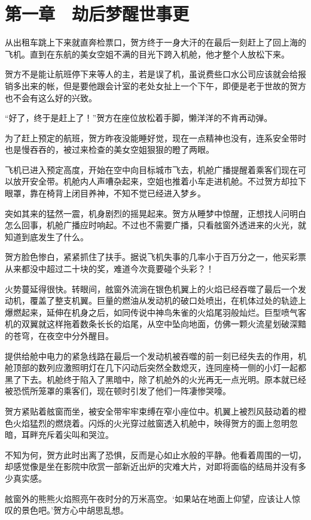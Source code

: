 \section{第一章　劫后梦醒世事更}

从出租车跳上下来就直奔检票口，贺方终于一身大汗的在最后一刻赶上了回上海的飞机。直到在东航的美女空姐不满的目光下跨入机舱，他才整个人放松下来。

贺方不是能让航班停下来等人的主，若是误了机，虽说费些口水公司应该就会给报销多出来的帐，但是要他跟会计室的老处女扯上一个下午，即便是老于世故的贺方也不会有这么好的兴致。

“好了，终于是赶上了！”贺方在座位放松着手脚，懒洋洋的不肯再动弹。

为了赶上预定的航班，贺方昨夜没能睡好觉，现在一点精神也没有，连系安全带时也是慢吞吞的，被过来检查的美女空姐狠狠的瞪了两眼。

飞机已进入预定高度，开始在空中向目标城市飞去，机舱广播提醒着乘客们现在可以放开安全带。机舱内人声嘈杂起来，空姐也推着小车走进机舱。不过贺方却拉下眼罩，靠在椅背上闭目养神，不知不觉已经进入梦乡。

突如其来的猛然一震，机身剧烈的摇晃起来。贺方从睡梦中惊醒，正想找人问明白怎么回事，机舱广播应时响起。不过也不需要广播，只看舷窗外透进来的火光，就知道到底发生了什么。

贺方脸色惨白，紧紧抓住了扶手。据说飞机失事的几率小于百万分之一，他买彩票从来都没中超过二十块的奖，难道今次竟要碰个头彩？！

火势蔓延得很快。转眼间，舷窗外流淌在银色机翼上的火焰已经吞噬了最后一个发动机，覆盖了整支机翼。巨量的燃油从发动机的破口处喷出，在机体过处的轨迹上爆燃起来，延伸在机身之后，如同传说中神鸟朱雀的火焰尾羽般灿烂。巨型喷气客机的双翼就这样拖着数条长长的焰尾，从空中坠向地面，仿佛一颗火流星划破深黯的苍穹，在夜空中分外醒目。

提供给舱中电力的紧急线路在最后一个发动机被吞噬的前一刻已经失去的作用，机舱顶部的数列应激照明灯在几下闪动后突然全数熄灭，连同座椅一侧的小灯一起都黑了下去。机舱终于陷入了黑暗中，除了机舱外的火光再无一点光明。原本就已经被恐慌所笼罩的乘客们，现在顿时引发了他们一阵凄惨哭嚎。

贺方紧贴着舷窗而坐，被安全带牢牢束缚在窄小座位中。机翼上被烈风鼓动着的橙色火焰猛烈的燃烧着。闪烁的火光穿过舷窗透入机舱中，映得贺方的面上忽明忽暗，耳畔充斥着尖叫和哭泣。

不知为何，贺方此时出离了恐惧，反而是心如止水般的平静。他看着周围的一切，却感觉像是坐在影院中欣赏一部新近出炉的灾难大片，对即将面临的结局并没有多少真实感。

舷窗外的熊熊火焰照亮午夜时分的万米高空。‘如果站在地面上仰望，应该让人惊叹的景色吧。’贺方心中胡思乱想。

